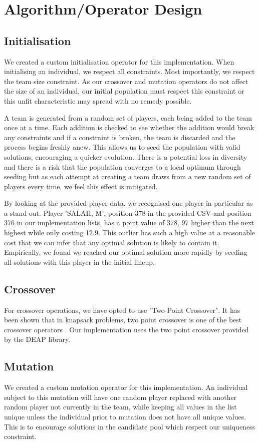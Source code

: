 \documentclass[11pt,a4paper]{article}
\begin{document}
\section{Algorithm/Operator Design}
\subsection{Initialisation}
We created a custom initialisation operator for this implementation. When initialising an individual, we respect all constraints. Most importantly, we respect the team size constraint. As our crossover and mutation operators do not affect the size of an individual, our initial population must respect this constraint or this unfit characteristic may spread with no remedy possible.

A team is generated from a random set of players, each being added to the team once at a time. Each addition is checked to see whether the addition would break any constraints and if a constraint is broken, the team is discarded and the process begins freshly anew. This allows us to seed the population with valid solutions, encouraging a quicker evolution. There is a potential loss in diversity and there is a risk that the population converges to a local optimum through seeding but as each attempt at creating a team draws from a new random set of players every time, we feel this effect is mitigated.

By looking at the provided player data, we recognised one player in particular as a stand out. Player 'SALAH, M', position 378 in the provided CSV and position 376 in our implementation lists, has a point value of 378, 97 higher than the next highest while only costing 12.9. This outlier has such a high value at a reasonable cost that we can infer that any optimal solution is likely to contain it. Empirically, we found we reached our optimal solution more rapidly by seeding all solutions with this player in the initial lineup.

\subsection{Crossover}
For crossover operations, we have opted to use "Two-Point Crossover". It has been shown that in knapsack problems, two point crossover is one of the best crossover operators \cite{Hakimi2016}. Our implementation uses the two point crossover provided by the DEAP library.

\subsection{Mutation}
We created a custom mutation operator for this implementation. An individual subject to this mutation will have one random player replaced with another random player not currently in the team, while keeping all values in the list unique unless the individual prior to mutation does not have all unique values. This is to encourage solutions in the candidate pool which respect our uniqueness constraint.
\end{document}
